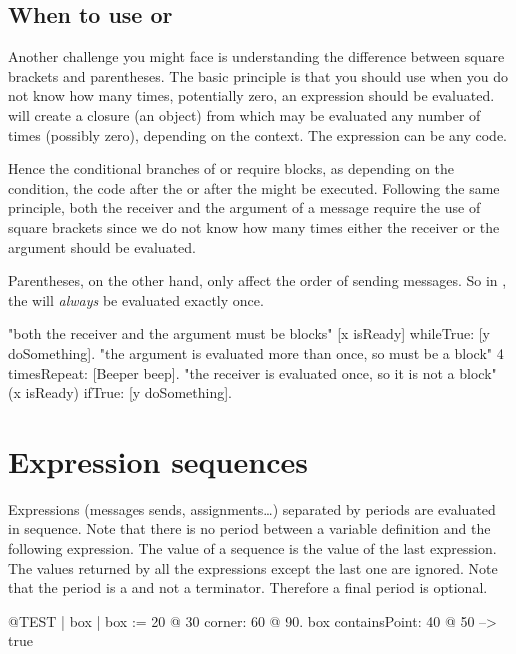 \documentclass[a4paper,10pt,twoside]{book}
\begin{document}
\subsection{When to use \lct{[ ]} or \lct{( )}}
Another challenge you might face is understanding the difference between square brackets and parentheses.
The basic principle is that you should use \ct{[ ]} when you do not know how many times, potentially zero, an expression should be evaluated.
 will create a  closure (\ie an object) from  which may be evaluated any number of times (possibly zero), depending on the context.
The expression can be any code.

Hence the conditional branches of  or  require blocks, as depending on the condition, the code after the  or after the  might be executed.
Following the same principle, both the receiver and the argument of a  message require the use of square brackets since we do not know how many times either the receiver or the argument should be evaluated.

Parentheses, on the other hand, only affect the order of sending messages.
So in , the  will \emph{always} be evaluated exactly once.

\begin{code}{}
"both the receiver and the argument must be blocks"
[x isReady] whileTrue: [y doSomething].   
"the argument is evaluated more than once, so must be a block"
4 timesRepeat: [Beeper beep].                   
"the receiver is evaluated once, so it is not a block"
(x isReady) ifTrue: [y doSomething].
\end{code}

\section{Expression sequences}
Expressions (\ie messages sends, assignments\dots) separated by periods are evaluated in sequence.
Note that there is no period between a variable definition and the following expression.
The value of a sequence is the value of the last expression.
The values returned by all the expressions except the last one are ignored.
Note that the period is a  and not a terminator.
Therefore a final period is optional.

\begin{code}{@TEST}
| box |
box := 20 @ 30 corner: 60 @ 90.
box containsPoint: 40 @ 50 --> true
\end{code}
\end{document}
